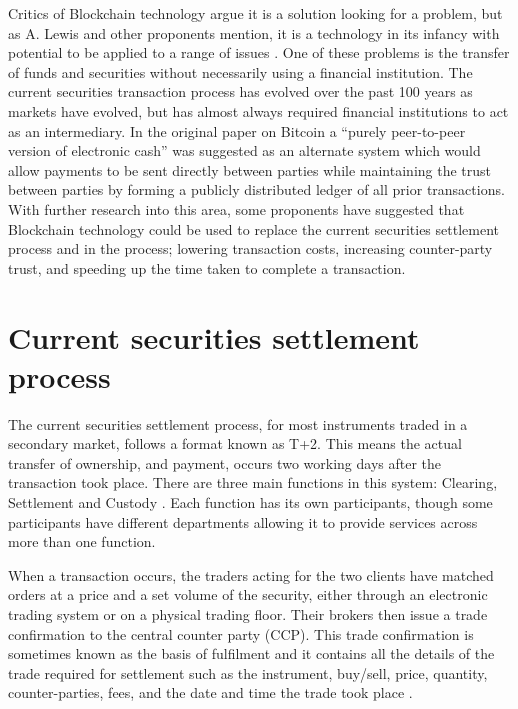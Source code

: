 \documentclass{article}
\begin{document}
Critics of Blockchain technology argue it is a solution looking for a problem, but as A. Lewis and other proponents mention, it is a technology in its infancy with potential to be applied to a range of issues \cite{SolnProb}. One of these problems is the transfer of funds and securities without necessarily using a financial institution. The current securities transaction process has evolved over the past 100 years as markets have evolved, but has almost always required financial institutions to act as an intermediary. In the original paper on Bitcoin a ``purely peer-to-peer version of electronic cash'' \cite{Bitcoin} was suggested as an alternate system which would allow payments to be sent directly between parties while maintaining the trust between parties by forming a publicly distributed ledger of all prior transactions.
With further research into this area, some proponents have suggested that Blockchain technology could be used to replace the current securities settlement process and in the process; lowering transaction costs, increasing counter-party trust, and speeding up the time taken to complete a transaction.

\section{Current securities settlement process}

The current securities settlement process, for most instruments traded in a secondary market, follows a format known as T+2. This means the actual transfer of ownership, and payment, occurs two working days after the transaction took place. There are three main functions in this system: Clearing, Settlement and Custody \cite{CCP}. Each function has its own participants, though some participants have different departments allowing it to provide services across more than one function.

When a transaction occurs, the traders acting for the two clients have matched orders at a price and a set volume of the security, either through an electronic trading system or on a physical trading floor. Their brokers then issue a trade confirmation to the central counter party (CCP). This trade confirmation is sometimes known as the basis of fulfilment and it contains all the details of the trade required for settlement such as the instrument, buy/sell, price, quantity, counter-parties, fees, and the date and time the trade took place \cite{CaytasCU}.
\end{document}
